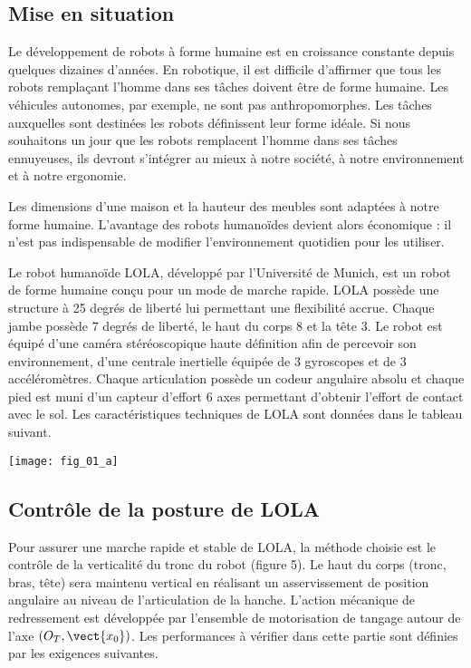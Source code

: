 \ifprof
\else
\begin{multicols}{2}
\fi

\subsection*{Mise en situation}
Le développement de robots à forme humaine est en
croissance constante depuis quelques dizaines
d’années. En robotique, il est difficile d’affirmer que
tous les robots remplaçant l’homme dans ses tâches
doivent être de forme humaine. Les véhicules
autonomes, par exemple, ne sont pas
anthropomorphes. Les tâches auxquelles sont
destinées les robots définissent leur forme idéale. Si
nous souhaitons un jour que les robots remplacent
l’homme dans ses tâches ennuyeuses, ils devront
s’intégrer au mieux à notre société, à notre
environnement et à notre ergonomie.

Les dimensions d’une maison et la hauteur des meubles sont adaptées à notre forme humaine. L’avantage
des robots humanoïdes devient alors économique : il n’est pas indispensable de modifier l’environnement
quotidien pour les utiliser.

Le robot humanoïde LOLA, développé par l’Université de Munich, est un robot de forme humaine
conçu pour un mode de marche rapide. LOLA possède une structure à 25 degrés de liberté lui permettant une
flexibilité accrue. Chaque jambe possède 7 degrés de liberté, le haut du corps 8 et la tête 3.
Le robot est équipé d’une caméra stéréoscopique haute définition afin de percevoir son environnement, d’une
centrale inertielle équipée de 3 gyroscopes et de 3 accéléromètres. Chaque articulation possède un codeur
angulaire absolu et chaque pied est muni d’un capteur d’effort 6 axes permettant d’obtenir l’effort de contact
avec le sol. Les caractéristiques techniques de LOLA sont données dans le tableau suivant.


\begin{center}
\texttt{[image: fig\_01\_a]}
\end{center}

\subsection*{Contrôle de la posture de LOLA}
Pour assurer une marche rapide et stable de LOLA, la méthode choisie est le contrôle de la verticalité du tronc
du robot (figure 5). Le haut du corps (tronc, bras, tête) sera maintenu vertical en réalisant un asservissement
de position angulaire au niveau de l'articulation de la hanche. L'action mécanique de redressement est
développée par l'ensemble de motorisation de tangage autour de l'axe $(O_T,\vect{x_0})$. Les performances à vérifier
dans cette partie sont définies par les exigences suivantes.



\end{multicols}
